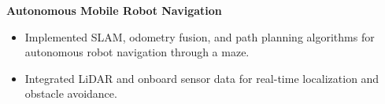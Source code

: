 \textbf{Autonomous Mobile Robot Navigation}
\begin{itemize}
  \item Implemented SLAM, odometry fusion, and path planning algorithms for autonomous robot navigation through a maze.
  \item Integrated LiDAR and onboard sensor data for real-time localization and obstacle avoidance.
\end{itemize}
